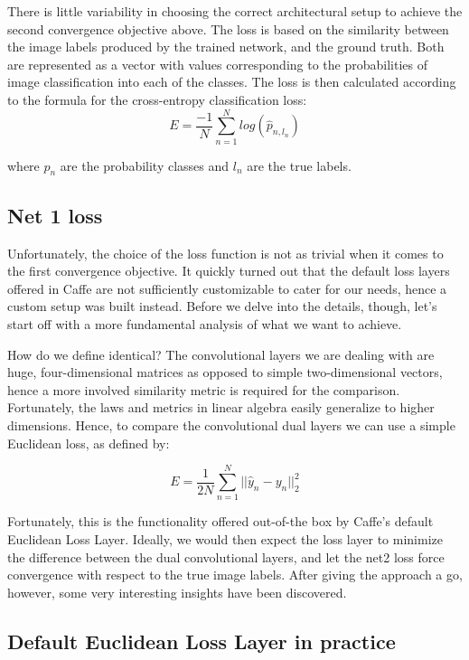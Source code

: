 \documentclass[a4paper, 11pt]{article}
\numberwithin{equation}{section}
\begin{document}
	There is little variability in choosing the correct architectural setup to achieve the second convergence objective above. The loss is based on the similarity between the image labels produced by the trained network, and the ground truth. Both are represented as a vector with values corresponding to the probabilities of image classification into each of the classes. The loss is then calculated according to the formula for the cross-entropy classification loss:
	\begin{equation}
		E = \frac{-1}{N} \sum_{n=1}^{N} log(\hat{p}_{n,l_n})
	\end{equation}
	
	where $\hat{p}_n$ are the probability classes and $l_n$ are the true labels.
	
	\subsection{Net 1 loss}
	
	Unfortunately, the choice of the loss function is not as trivial when it comes to the first convergence objective. It quickly turned out that the default loss layers offered in Caffe are not sufficiently customizable to cater for our needs, hence a custom setup was built instead. Before we delve into the details, though, let's start off with a more fundamental analysis of what we want to achieve.
	
	How do we define identical? The convolutional layers we are dealing with are huge, four-dimensional matrices as opposed to simple two-dimensional vectors, hence a more involved similarity metric is required for the comparison. Fortunately, the laws and metrics in linear algebra easily generalize to higher dimensions. Hence, to compare the convolutional dual layers we can use a simple Euclidean loss, as defined by:
	
	\begin{equation}
		E=\frac{1}{2N} \sum_{n=1}^{N} ||\hat{y}_n-y_n||^2_2
	\end{equation}
	
	Fortunately, this is the functionality offered out-of-the box by Caffe's default Euclidean Loss Layer. Ideally, we would then expect the loss layer to minimize the difference between the dual convolutional layers, and let the net2 loss force convergence with respect to the true image labels. After giving the approach a go, however, some very interesting insights have been discovered.
		
	\subsection{Default Euclidean Loss Layer in practice}
	
\end{document}
